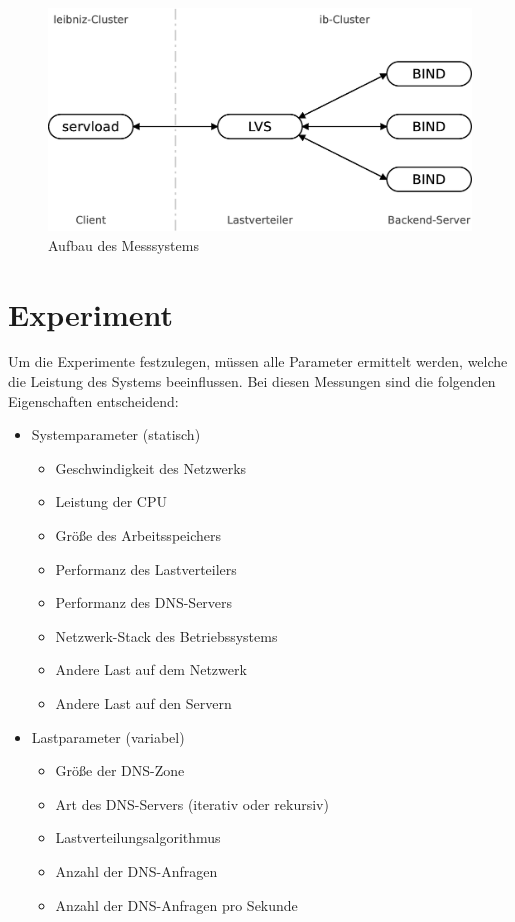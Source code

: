 \documentclass[a4paper, 12pt, BCOR10mm, DIV12, toc=bibliography, toc=listof, german]{scrbook}
\begin{document}
		\begin{figure}
			\centering
			\includegraphics[width=12cm]{images/test-system}
			\caption{Aufbau des Messsystems}
			\label{fig:messsystem}
		\end{figure}


		\section{Experiment} %
		\label{sec:experiment}

			Um die Experimente festzulegen, müssen alle Parameter ermittelt werden, welche die Leistung
			des Systems beeinflussen. Bei diesen Messungen sind die folgenden Eigenschaften entscheidend:

			\begin{itemize}
				\item Systemparameter (statisch)
					\begin{itemize}
						\item Geschwindigkeit des Netzwerks
						\item Leistung der CPU
						\item Größe des Arbeitsspeichers
						\item Performanz des Lastverteilers
						\item Performanz des DNS-Servers
						\item Netzwerk-Stack des Betriebssystems
						\item Andere Last auf dem Netzwerk
						\item Andere Last auf den Servern
					\end{itemize}
				\item Lastparameter (variabel)
					\begin{itemize}
						\item Größe der DNS-Zone
						\item Art des DNS-Servers (iterativ oder rekursiv)
						\item Lastverteilungsalgorithmus
						\item Anzahl der DNS-Anfragen
						\item Anzahl der DNS-Anfragen pro Sekunde
					\end{itemize}
			\end{itemize}
\end{document}
